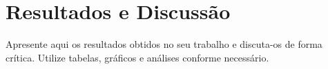 \chapter{Resultados e Discussão}
\label{cap:resultados}

Apresente aqui os resultados obtidos no seu trabalho e discuta-os de forma crítica. Utilize tabelas, gráficos e análises conforme necessário.